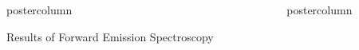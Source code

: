 \documentclass[final]{beamer}
\newlength{\columnheight}
\begin{document}
\begin{frame}
\begin{columns}
\begin{column}{.49\textwidth}
\begin{beamercolorbox}[center,wd=\textwidth]{postercolumn}
\begin{minipage}[T]{.99\textwidth}
{\begin{block}{Results of Forward Emission Spectroscopy}
            \end{block}
			\vspace{2cm}
          }
        \end{minipage}
      \end{beamercolorbox}
    \end{column}
    \begin{column}{.49\textwidth}
      \begin{beamercolorbox}[center,wd=\textwidth]{postercolumn}
        \begin{minipage}[T]{.99\textwidth} %
          \parbox[t][\columnheight]{\textwidth}{
}
\end{minipage}
\end{beamercolorbox}
\end{column}
\end{columns}
\end{frame}
\end{document}
